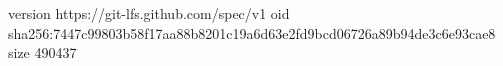 version https://git-lfs.github.com/spec/v1
oid sha256:7447c99803b58f17aa88b8201c19a6d63e2fd9bcd06726a89b94de3c6e93cae8
size 490437
